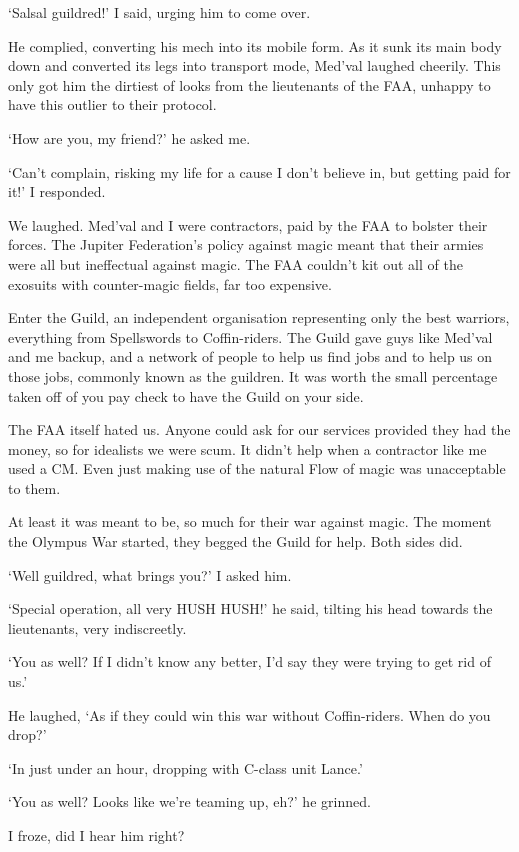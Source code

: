 `Salsal guildred!' I said, urging him to come over.

He complied, converting his mech into its mobile form. As it sunk its main body down and converted its legs into transport mode, Med'val laughed cheerily. This only got him the dirtiest of looks from the lieutenants of the FAA, unhappy to have this outlier to their protocol.

`How are you, my friend?' he asked me.

`Can't complain, risking my life for a cause I don't believe in, but getting paid for it!' I responded.

We laughed. Med'val and I were contractors, paid by the FAA to bolster their forces. The Jupiter Federation's policy against magic meant that their armies were all but ineffectual against magic. The FAA couldn't kit out all of the exosuits with counter-magic fields, far too expensive.

Enter the Guild, an independent organisation representing only the best warriors, everything from Spellswords to Coffin-riders. The Guild gave guys like Med'val and me backup, and a network of people to help us find jobs and to help us on those jobs, commonly known as the guildren. It was worth the small percentage taken off of you pay check to have the Guild on your side.

The FAA itself hated us. Anyone could ask for our services provided they had the money, so for idealists we were scum. It didn't help when a contractor like me used a CM. Even just making use of the natural Flow of magic was unacceptable to them.

At least it was meant to be, so much for their war against magic. The moment the Olympus War started, they begged the Guild for help. Both sides did.

`Well guildred, what brings you?' I asked him.

`Special operation, all very HUSH HUSH!' he said, tilting his head towards the lieutenants, very indiscreetly.

`You as well? If I didn't know any better, I'd say they were trying to get rid of us.'

He laughed, `As if they could win this war without Coffin-riders. When do you drop?'

`In just under an hour, dropping with C-class unit Lance.'

`You as well? Looks like we're teaming up, eh?' he grinned.

I froze, did I hear him right?

